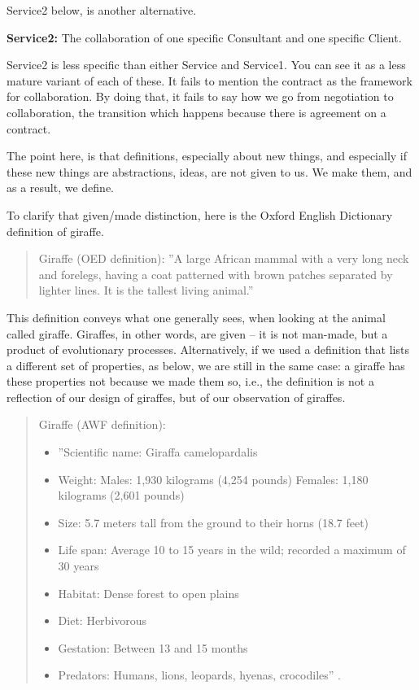 \documentclass[graybox,envcountchap,sectrefs]{svmono}
\begin{document}
Service2 below, is another alternative.

\begin{svgraybox}
\textbf{Service2:} The collaboration of one specific Consultant and one specific Client.
\end{svgraybox}

Service2 is less specific than either Service and Service1. You can see it as a less mature variant of each of these. It fails to mention the contract as the framework for collaboration. By doing that, it fails to say how we go from negotiation to collaboration, the transition which happens because there is agreement on a contract.

The point here, is that definitions, especially about new things, and especially if these new things are abstractions, ideas, are not given to us. We make them, and as a result, we define.

To clarify that given/made distinction, here is the Oxford English Dictionary definition of giraffe.

\begin{quote}
Giraffe (OED definition): ''A large African mammal with a very long neck and forelegs, having a coat patterned with brown patches separated by lighter lines. It is the tallest living animal.'' \cite{def-giraffe}
\end{quote}

This definition conveys what one generally sees, when looking at the animal called giraffe. Giraffes, in other words, are given -- it is not man-made, but a product of evolutionary processes. Alternatively, if we used a definition that lists a different set of properties, as below, we are still in the same case: a giraffe has these properties not because we made them so, i.e., the definition is not a reflection of our design of giraffes, but of our observation of giraffes.

\begin{quote}
Giraffe (AWF definition):
\begin{itemize}
\item ''Scientific name: Giraffa camelopardalis
\item Weight: Males: 1,930 kilograms (4,254 pounds) Females: 1,180 kilograms (2,601 pounds)
\item Size: 5.7 meters tall from the ground to their horns (18.7 feet)
\item Life span: Average 10 to 15 years in the wild; recorded a maximum of 30 years
\item Habitat: Dense forest to open plains
\item Diet: Herbivorous
\item Gestation: Between 13 and 15 months
\item Predators: Humans, lions, leopards, hyenas, crocodiles'' \cite{awf-giraffe}.
\end{itemize}
\end{quote}
\end{document}
